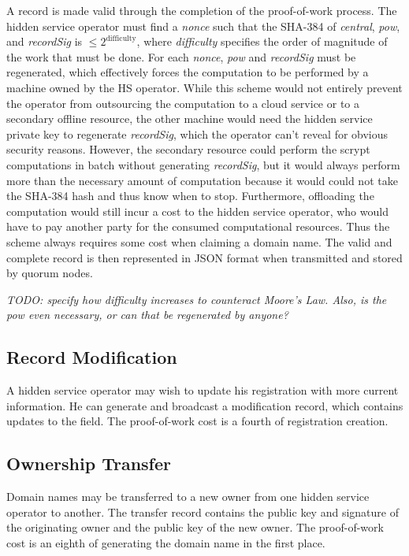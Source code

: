 A record is made valid through the completion of the proof-of-work process. The hidden service operator must find a \textit{nonce} such that the SHA-384 of \textit{central}, \textit{pow}, and \textit{recordSig} is $ \leq 2^\textrm{difficulty} $, where \textit{difficulty} specifies the order of magnitude of the work that must be done. For each \textit{nonce}, \textit{pow} and \textit{recordSig} must be regenerated, which effectively forces the computation to be performed by a machine owned by the HS operator. While this scheme would not entirely prevent the operator from outsourcing the computation to a cloud service or to a secondary offline resource, the other machine would need the hidden service private key to regenerate \textit{recordSig}, which the operator can't reveal for obvious security reasons. However, the secondary resource could perform the scrypt computations in batch without generating \textit{recordSig}, but it would always perform more than the necessary amount of computation because it would could not take the SHA-384 hash and thus know when to stop. Furthermore, offloading the computation would still incur a cost to the hidden service operator, who would have to pay another party for the consumed computational resources. Thus the scheme always requires some cost when claiming a domain name. The valid and complete record is then represented in JSON format when transmitted and stored by quorum nodes.

\textit{TODO: specify how difficulty increases to counteract Moore's Law. Also, is the pow even necessary, or can that be regenerated by anyone?}

\subsection{Record Modification}

A hidden service operator may wish to update his registration with more current information. He can generate and broadcast a modification record, which contains updates to the field. The proof-of-work cost is a fourth of registration creation.

\subsection{Ownership Transfer}

Domain names may be transferred to a new owner from one hidden service operator to another. The transfer record contains the public key and signature of the originating owner and the public key of the new owner. The proof-of-work cost is an eighth of generating the domain name in the first place.

